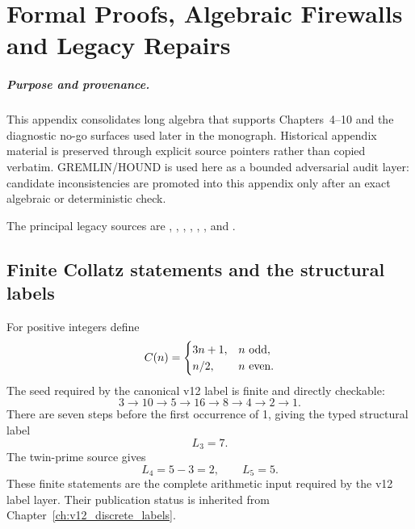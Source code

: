\documentclass[11pt,a4paper,twoside]{book}
\def\({}%
\def\){}%
\theoremstyle{definition}
\begin{document}
\appendix
\pagestyle{plain}

\chapter{Formal Proofs, Algebraic Firewalls and Legacy Repairs}
\label{app:v12_formal_proofs}

\paragraph{Purpose and provenance.}
This appendix consolidates long algebra that supports Chapters~4--10 and the
diagnostic no-go surfaces used later in the monograph.  Historical appendix
material is preserved through explicit source pointers rather than copied
verbatim.  GREMLIN/HOUND is used here as a bounded adversarial audit layer:
candidate inconsistencies are promoted into this appendix only after an exact
algebraic or deterministic check.

The principal legacy sources are
,
,
,
,
,
, and
.

\section{Finite Collatz statements and the structural labels}

For positive integers define
\[
C(n)=
\begin{cases}
3n+1,&n\ \hbox{odd},\\
n/2,&n\ \hbox{even}.
\end{cases}
\]
The seed required by the canonical v12 label is finite and directly checkable:
\[
3\to10\to5\to16\to8\to4\to2\to1.
\]
There are seven steps before the first occurrence of \(1\), giving the typed
structural label
\[
\boxed{L_3=7.}
\]
The twin-prime source gives
\[
\boxed{L_4=5-3=2,\qquad L_5=5.}
\]
These finite statements are the complete arithmetic input required by the
v12 label layer.  Their publication status is inherited from
Chapter~\ref{ch:v12_discrete_labels}.
\end{document}
